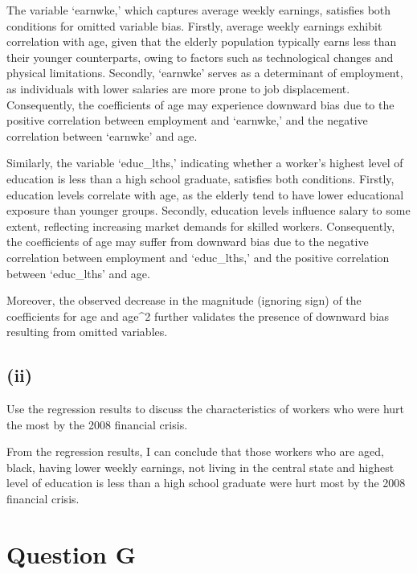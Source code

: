 \documentclass[
]{article}
\begin{document}
The variable `earnwke,' which captures average weekly earnings,
satisfies both conditions for omitted variable bias. Firstly, average
weekly earnings exhibit correlation with age, given that the elderly
population typically earns less than their younger counterparts, owing
to factors such as technological changes and physical limitations.
Secondly, `earnwke' serves as a determinant of employment, as
individuals with lower salaries are more prone to job displacement.
Consequently, the coefficients of age may experience downward bias due
to the positive correlation between employment and `earnwke,' and the
negative correlation between `earnwke' and age.

Similarly, the variable `educ\_lths,' indicating whether a worker's
highest level of education is less than a high school graduate,
satisfies both conditions. Firstly, education levels correlate with age,
as the elderly tend to have lower educational exposure than younger
groups. Secondly, education levels influence salary to some extent,
reflecting increasing market demands for skilled workers. Consequently,
the coefficients of age may suffer from downward bias due to the
negative correlation between employment and `educ\_lths,' and the
positive correlation between `educ\_lths' and age.

Moreover, the observed decrease in the magnitude (ignoring sign) of the
coefficients for age and age\^{}2 further validates the presence of
downward bias resulting from omitted variables.

\hypertarget{ii-3}{%
\subsection{(ii)}\label{ii-3}}

Use the regression results to discuss the characteristics of workers who
were hurt the most by the 2008 financial crisis. \vspace{1em}

From the regression results, I can conclude that those workers who are
aged, black, having lower weekly earnings, not living in the central
state and highest level of education is less than a high school graduate
were hurt most by the 2008 financial crisis.

\hypertarget{question-g}{%
\section{Question G}\label{question-g}}
\end{document}

